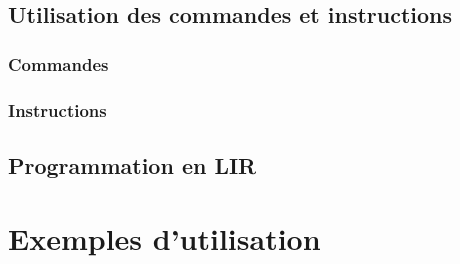 \documentclass[11pt,a4paper,titlepage,openany]{book}
\begin{document}
        \section{Utilisation des commandes et instructions}
            

            \subsection{Commandes}
                

            \subsection{Instructions}
            

        \section{Programmation en LIR}
            

    \chapter{Exemples d'utilisation}
        
\end{document}
